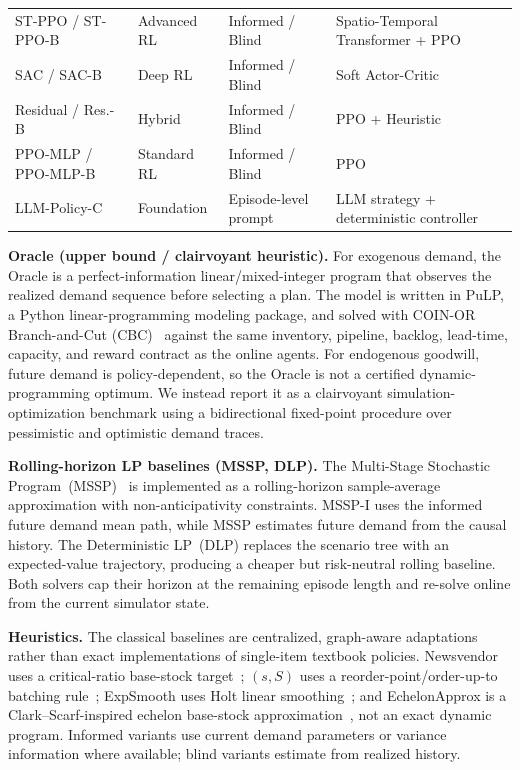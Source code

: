 \documentclass[10pt,a4paper]{article}
\begin{document}
\begin{table}[!htbp]
\begin{tabular}{@{} l l l p{5.5cm} @{}}
ST-PPO / ST-PPO-B
            & Advanced RL   & Informed / Blind  & Spatio-Temporal Transformer + PPO~\citep{vaswani2017,schulman2017,zambaldi2018,parisotto2020} \\
SAC / SAC-B & Deep RL       & Informed / Blind  & Soft Actor-Critic~\citep{haarnoja2018} \\
\rowcolor{lightgray}
Residual / Res.-B
            & Hybrid        & Informed / Blind  & PPO + Heuristic~\citep{silver2019} \\
PPO-MLP / PPO-MLP-B
            & Standard RL   & Informed / Blind  & PPO~\citep{schulman2017} \\
\rowcolor{lightgray}
LLM-Policy-C
            & Foundation    & Episode-level prompt & LLM strategy + deterministic controller~\citep{quan2024} \\
\bottomrule
\end{tabular}
\end{table}

\textbf{Oracle (upper bound / clairvoyant heuristic).}
For exogenous demand, the Oracle is a perfect-information
linear/mixed-integer program that observes the realized demand sequence
before selecting a plan. The model is written in PuLP, a Python
linear-programming modeling package, and solved with COIN-OR
Branch-and-Cut (CBC)~\citep{mitchell2011,forrest2005cbc} against the
same inventory, pipeline, backlog, lead-time, capacity, and reward
contract as the online agents. For endogenous goodwill, future demand is
policy-dependent, so the Oracle is not a certified dynamic-programming
optimum. We instead report it as a clairvoyant simulation-optimization
benchmark using a bidirectional fixed-point procedure over pessimistic
and optimistic demand traces.

\textbf{Rolling-horizon LP baselines (MSSP, DLP).}
The Multi-Stage Stochastic Program~(MSSP)~\citep{birge2011} is
implemented as a rolling-horizon sample-average approximation with
non-anticipativity constraints. MSSP-I uses the informed future demand
mean path, while MSSP estimates future demand from the causal history.
The Deterministic LP~(DLP) replaces the scenario tree with an
expected-value trajectory, producing a cheaper but risk-neutral rolling
baseline. Both solvers cap their horizon at the remaining episode
length and re-solve online from the current simulator state.

\textbf{Heuristics.}
The classical baselines are centralized, graph-aware adaptations rather
than exact implementations of single-item textbook policies. Newsvendor
uses a critical-ratio base-stock target~\citep{arrow1951,porteus2002};
$(s,S)$ uses a reorder-point/order-up-to batching rule~\citep{scarf1960ss,porteus2002};
ExpSmooth uses Holt linear smoothing~\citep{hyndman2021}; and
EchelonApprox is a Clark--Scarf-inspired echelon base-stock
approximation~\citep{clark1960}, not an exact dynamic program. Informed
variants use current demand parameters or variance information where
available; blind variants estimate from realized history.
\end{document}
